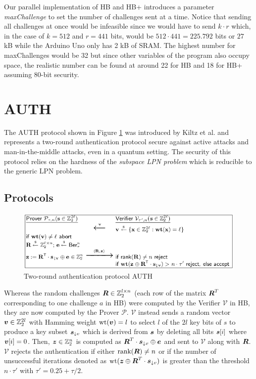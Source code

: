 \documentclass[11pt,a4paper]{article}
\begin{document}
Our parallel implementation of HB and HB+ introduces a parameter \textit{maxChallenge} to set the number of challenges sent at a time. 
Notice that sending all challenges at once would be infeasible since we would have to send $k \cdot r$ which, in the case of $ k = 512$ and $r = 441$ bits, would be $512 \cdot 441 = 225.792$ bits or $27$ kB while the Arduino Uno only has 2 kB of SRAM. 
The highest number for maxChallenges would be 32 but since other variables of the program also occupy space, the realistic number can be found at around 22 for HB and 18 for HB+ assuming 80-bit security. 
 

\section{AUTH}

The AUTH protocol shown in Figure \ref{fig3} was introduced by Kiltz et al. \cite{Kiltz2017} and represents a two-round authentication protocol secure against active attacks and man-in-the-middle attacks, even in a quantum setting. The security of this protocol relies on the hardness of the \textit{subspace LPN problem} which is reducible to the generic LPN problem.

\subsection{Protocols}

\begin{figure}[h]
	\includegraphics[width=12cm]{auth}
	\centering
	\caption{Two-round authentication protocol AUTH}
	\label{fig3}
\end{figure}

Whereas the random challenges $\boldsymbol{R} \in \mathbb{Z}_2^{l \times n}$ (each row of the matrix $\boldsymbol{R}^T$ corresponding to one challenge $a$ in HB) were computed by the Verifier $\mathcal{V}$ in HB, they are now computed by the Prover $\mathcal{P}$.
$\mathcal{V}$ instead sends a random vector $\boldsymbol{v} \in \mathbb{Z}_2^{2l}$ with Hamming weight $\text{wt}(\boldsymbol{v}) = l$ to select $l$ of the $2l$ key bits of $s$ to produce a key subset $\boldsymbol{s}_{\downarrow v}$ which is derived from $\boldsymbol{s}$ by deleting all bits $\boldsymbol{s}[i]$ where $\boldsymbol{v}[i] = 0$.
Then, $\boldsymbol{z} \in \mathbb{Z}_2^n$ is computed as $\boldsymbol{R}^T \cdot \boldsymbol{s}_{\downarrow v} \oplus \boldsymbol{e}$ and sent to $\mathcal{V}$ along with $\boldsymbol{R}$.
$\mathcal{V}$ rejects the authentication if either $\text{rank}(\boldsymbol{R}) \neq n$ or if the number of unsuccessful iterations denoted as $\text{wt}(\boldsymbol{z} \oplus \boldsymbol{R}^T \cdot \boldsymbol{s}_{\downarrow v})$ is greater than the threshold $n \cdot \tau'$ with $\tau' = 0.25 + \tau/2$.
\end{document}
